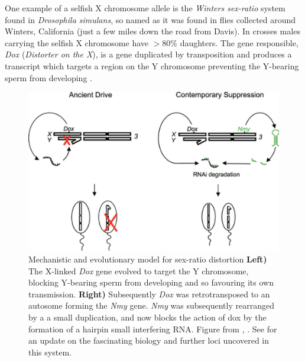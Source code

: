 {One example of a selfish X
chromosome allele is the {\it Winters sex-ratio} system found in {\it Drosophila
  simulans}, so named as it was found in flies collected around Winters, California (just a
few miles down the road from Davis). In crosses males carrying the selfish X
chromosome have  $>80\%$ daughters. The gene
responsible, {\it Dox} ({\it Distorter on the X}), is a gene
duplicated by transposition and produces a transcript which targets a region
on the Y chromosome preventing the Y-bearing sperm from developing
\citet[see Figure \ref{fig:winters_sperm} from][]{tao2007sexII}. 


  \begin{figure}
\begin{center}
\includegraphics[width= \textwidth]{Journal_figs/single_locus_selection/Winters_sex_ratio_drive/Ferree_Barbash_dox_cartoon.png}
\end{center}
\caption{Mechanistic and evolutionary model for sex-ratio distortion
{\bf Left)} The X-linked {\it Dox} gene evolved to target the Y chromosome, blocking
Y-bearing sperm from developing and so favouring its own
transmission. {\bf Right)} Subsequently {\it Dox} was retrotransposed to an
autosome forming the {\it Nmy} gene. {\it Nmy} was subsequently rearranged by a
a small duplication, and now blocks the action of dox by the formation
of a hairpin small interfering RNA. Figure from
\citet{ferree2007distorted}, \PLOSccBY. See \citet{lin2018hprna} for an update on the fascinating biology and further
loci uncovered in this system.} \label{fig:dox_cartoon}
\end{figure}

}
